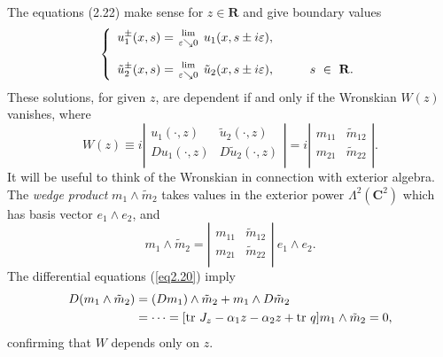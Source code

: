 \documentclass{surv-l}
\theoremstyle{plain}
\theoremstyle{definition}
\numberwithin{equation}{chapter}
\begin{document}
The equations (2.22) make sense for $z\in \mathbf{R}$ and give boundary values
\begin{align}\label{eq2.25}
\left\{\begin{array}{ll}
u_{1}^{\pm}(x,s)={{\mathrm{lim}}\atop{\varepsilon\searrow 0}}\ u_{1}(x,s\pm i\varepsilon),&\\ \\
\tilde{u}_{2}^{\pm}(x,s)={{\mathrm{lim}}\atop{\varepsilon\searrow 0}}\ \tilde{u}_{2}(x,s\pm i\varepsilon),& \qquad s\ \in\ \mathbf{R}.\end{array}\right.
\end{align}
These solutions, for given $z$, are dependent if and only if the Wronskian $W(z)$ vanishes, where
\begin{equation}\label{eq2.26}
W(z)\equiv i\left|
             \begin{array}{cc}
               u_{1}(\cdot, z)& \tilde{u}_{2}(\cdot, z) \\
               Du_{1}(\cdot, z) & D\tilde{u}_{2}(\cdot, z) \\
             \end{array}
             \right|=i\left|
                        \begin{array}{cc}
                          m_{11} & \tilde{m}_{12} \\
                          m_{21} & \tilde{m}_{22} \\
                        \end{array}
                      \right|.
    \end{equation}
It will be useful to think of the Wronskian in connection with exterior algebra. The \emph{wedge product} $m_{1}\wedge\tilde{m}_{2}$ takes values in the exterior power $\Lambda^{2}(\mathbf{C}^{2})$ which has basis vector $e_{1}\wedge e_{2}$, and
\begin{equation*}
m_{1}\wedge\tilde{m}_{2}=\left|
                            \begin{array}{cc}
                              m_{11} & \tilde{m}_{12} \\
                               m_{21} & \tilde{m}_{22} \\
                            \end{array}
                          \right|\ e_{1} \wedge e_{2}.
\end{equation*}
The differential equations (\ref{eq2.20}) imply
\begin{align}\label{eq2.27}
D(m_{1}\wedge\tilde{m}_{2})&=(Dm_{1})\wedge\tilde{m}_{2}+m_{1}\wedge D\tilde{m}_{2}\\ \notag
&=\cdots= [\mathrm{tr}\ J_{z}-\alpha_{1}z-\alpha_{2}z+ \mathrm{tr}\ q]m_{1}\wedge\tilde{m}_{2}=0,
\end{align}
confirming that $W$ depends only on $z$.
\end{document}
